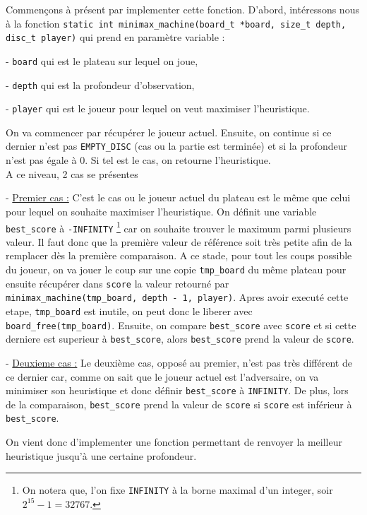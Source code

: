 \documentclass{report}
\begin{document}
Commençons à présent par implementer cette fonction. D'abord, intéressons nous à la fonction \texttt{static int minimax\_machine(board\_t *board, size\_t depth, disc\_t player)} qui prend en paramètre variable :

- \texttt{board} qui est le plateau sur lequel on joue,

- \texttt{depth} qui est la profondeur d'observation,

- \texttt{player} qui est le joueur pour lequel on veut maximiser l'heuristique.

On va commencer par récupérer le joueur actuel. Ensuite, on continue si ce dernier n'est pas \texttt{EMPTY\_DISC} (cas ou la partie est terminée) et si la profondeur n'est pas égale à 0. Si tel est le cas, on retourne l'heuristique.
\\A ce niveau, 2 cas se présentes \newline

- \underline{Premier cas :}
C'est le cas ou le joueur actuel du plateau est le même que celui pour lequel on souhaite maximiser l'heuristique.
On définit une variable \texttt{best\_score} à \texttt{-INFINITY} \footnote{On notera que, l'on fixe \texttt{INFINITY} à la borne maximal d'un integer, soir $2^{15}-1 = 32767 $.} car on souhaite trouver le maximum parmi plusieurs valeur. Il faut donc que la première valeur de référence soit très petite afin de la remplacer dès la première comparaison.
A ce stade, pour tout les coups possible du joueur, on va jouer le coup sur une copie \texttt{tmp\_board} du même plateau pour ensuite récupérer dans \texttt{score} la valeur retourné par \texttt{minimax\_machine(tmp\_board, depth - 1, player)}. Apres avoir executé cette etape, \texttt{tmp\_board} est inutile, on peut donc le liberer avec \texttt{board\_free(tmp\_board)}.
Ensuite, on compare \texttt{best\_score} avec \texttt{score} et si cette derniere est superieur à \texttt{best\_score}, alors \texttt{best\_score} prend la valeur de \texttt{score}.\newline

- \underline{Deuxieme cas :}
Le deuxième cas, opposé au premier, n'est pas très différent de ce dernier car, comme on sait que le joueur actuel est l'adversaire, on va minimiser son heuristique et donc définir \texttt{best\_score} à \texttt{INFINITY}. De plus, lors de la comparaison, \texttt{best\_score} prend la valeur de \texttt{score} si \texttt{score} est inférieur à \texttt{best\_score}.\newline

On vient donc d'implementer une fonction permettant de renvoyer la meilleur heuristique jusqu'à une certaine profondeur.
\end{document}
